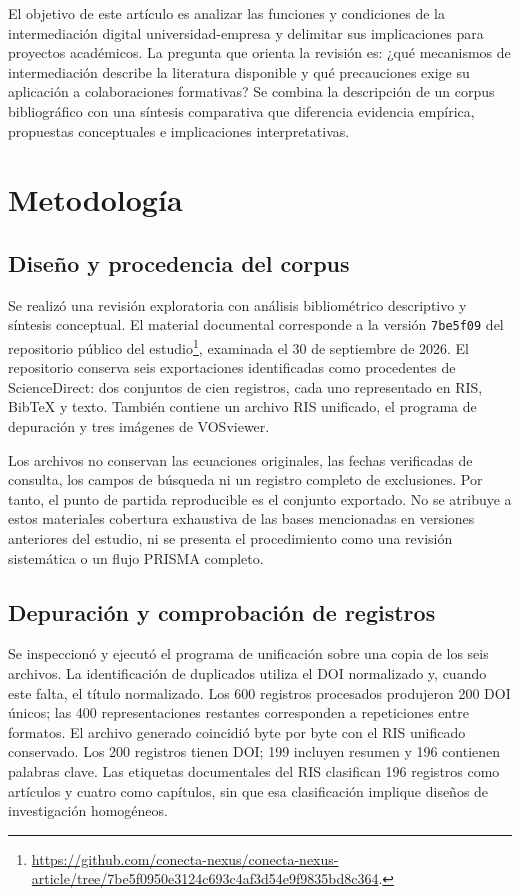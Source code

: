 \documentclass[12pt,twocolumn]{article}
\begin{document}
El objetivo de este artículo es analizar las funciones y condiciones de la intermediación digital universidad-empresa y delimitar sus implicaciones para proyectos académicos. La pregunta que orienta la revisión es: ¿qué mecanismos de intermediación describe la literatura disponible y qué precauciones exige su aplicación a colaboraciones formativas? Se combina la descripción de un corpus bibliográfico con una síntesis comparativa que diferencia evidencia empírica, propuestas conceptuales e implicaciones interpretativas.

\section{Metodología}
\subsection{Diseño y procedencia del corpus}
Se realizó una revisión exploratoria con análisis bibliométrico descriptivo y síntesis conceptual. El material documental corresponde a la versión \texttt{7be5f09} del repositorio público del estudio\footnote{\url{https://github.com/conecta-nexus/conecta-nexus-article/tree/7be5f0950e3124c693c4af3d54e9f9835bd8c364}.}, examinada el 30 de septiembre de 2026. El repositorio conserva seis exportaciones identificadas como procedentes de ScienceDirect: dos conjuntos de cien registros, cada uno representado en RIS, BibTeX y texto. También contiene un archivo RIS unificado, el programa de depuración y tres imágenes de VOSviewer.

Los archivos no conservan las ecuaciones originales, las fechas verificadas de consulta, los campos de búsqueda ni un registro completo de exclusiones. Por tanto, el punto de partida reproducible es el conjunto exportado. No se atribuye a estos materiales cobertura exhaustiva de las bases mencionadas en versiones anteriores del estudio, ni se presenta el procedimiento como una revisión sistemática o un flujo PRISMA completo.

\subsection{Depuración y comprobación de registros}
Se inspeccionó y ejecutó el programa de unificación sobre una copia de los seis archivos. La identificación de duplicados utiliza el DOI normalizado y, cuando este falta, el título normalizado. Los 600 registros procesados produjeron 200 DOI únicos; las 400 representaciones restantes corresponden a repeticiones entre formatos. El archivo generado coincidió byte por byte con el RIS unificado conservado. Los 200 registros tienen DOI; 199 incluyen resumen y 196 contienen palabras clave. Las etiquetas documentales del RIS clasifican 196 registros como artículos y cuatro como capítulos, sin que esa clasificación implique diseños de investigación homogéneos.
\end{document}
